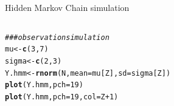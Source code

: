 \documentclass{beamer}\usepackage[]{graphicx}\usepackage[]{color}
\makeatletter
\newcommand{\hlnum}[1]{\textcolor[rgb]{0.686,0.059,0.569}{#1}}%
\newcommand{\hlcom}[1]{\textcolor[rgb]{0.678,0.584,0.686}{\textit{#1}}}%
\newcommand{\hlopt}[1]{\textcolor[rgb]{0,0,0}{#1}}%
\newcommand{\hlstd}[1]{\textcolor[rgb]{0.345,0.345,0.345}{#1}}%
\newcommand{\hlkwb}[1]{\textcolor[rgb]{0.69,0.353,0.396}{#1}}%
\newcommand{\hlkwc}[1]{\textcolor[rgb]{0.333,0.667,0.333}{#1}}%
\newcommand{\hlkwd}[1]{\textcolor[rgb]{0.737,0.353,0.396}{\textbf{#1}}}%
\newenvironment{kframe}{%
 \def\at@end@of@kframe{}%
 \ifinner\ifhmode%
  \def\at@end@of@kframe{\end{minipage}}%
  \begin{minipage}{\columnwidth}%
 \fi\fi%
 \def\FrameCommand##1{\hskip\@totalleftmargin \hskip-\fboxsep
 \colorbox{shadecolor}{##1}\hskip-\fboxsep
     \hskip-\linewidth \hskip-\@totalleftmargin \hskip\columnwidth}%
 \MakeFramed {\advance\hsize-\width
   \@totalleftmargin\z@ \linewidth\hsize
   \@setminipage}}%
 {\par\unskip\endMakeFramed%
 \at@end@of@kframe}
\newenvironment{knitrout}{}{} %
\makeatother
\begin{document}
\begin{frame}[fragile]{Hidden Markov Chain simulation}
\begin{columns}
\begin{column}{0.5\textwidth}
\begin{knitrout}\tiny
{}\color{fgcolor}\begin{kframe}
\begin{alltt}
\hlcom{### observation simulation}
\hlstd{mu} \hlkwb{<-} \hlkwd{c}\hlstd{(}\hlnum{3}\hlstd{,} \hlnum{7}\hlstd{)}
\hlstd{sigma} \hlkwb{<-} \hlkwd{c}\hlstd{(}\hlnum{2}\hlstd{,}\hlnum{3}\hlstd{)}
\hlstd{Y.hmm} \hlkwb{<-} \hlkwd{rnorm}\hlstd{(N,} \hlkwc{mean}\hlstd{=mu[Z],} \hlkwc{sd}\hlstd{=sigma[Z])}
\hlkwd{plot}\hlstd{(Y.hmm,} \hlkwc{pch}\hlstd{=}\hlnum{19}\hlstd{)}
\hlkwd{plot}\hlstd{(Y.hmm,} \hlkwc{pch}\hlstd{=}\hlnum{19}\hlstd{,} \hlkwc{col}\hlstd{=Z}\hlopt{+}\hlnum{1}\hlstd{)}
\end{alltt}
\end{kframe}
\end{knitrout}
\end{column}
\begin{column}{0.4\textwidth}

\end{column}
\end{columns}
\end{frame}
\end{document}

